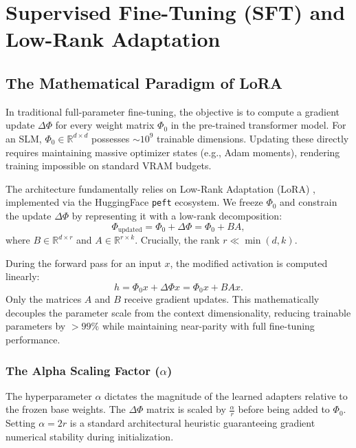 \documentclass[12pt,a4paper]{report}
\newcommand{\R}{\mathbb{R}}
\begin{document}
\chapter{Supervised Fine-Tuning (SFT) and Low-Rank Adaptation}
\label{chap:sft}

\section{The Mathematical Paradigm of LoRA}

In traditional full-parameter fine-tuning, the objective is to compute a gradient update $\Delta\Phi$ for every weight matrix $\Phi_0$ in the pre-trained transformer model. For an SLM, $\Phi_0 \in \R^{d \times d}$ possesses $\sim 10^9$ trainable dimensions. Updating these directly requires maintaining massive optimizer states (e.g., Adam moments), rendering training impossible on standard VRAM budgets.

The architecture fundamentally relies on Low-Rank Adaptation (LoRA) \cite{hu2021lora}, implemented via the HuggingFace \texttt{peft} ecosystem. We freeze $\Phi_0$ and constrain the update $\Delta\Phi$ by representing it with a low-rank decomposition:
\begin{equation}
    \Phi_{\text{updated}} = \Phi_0 + \Delta\Phi = \Phi_0 + B A,
\end{equation}
where $B \in \R^{d \times r}$ and $A \in \R^{r \times k}$. Crucially, the rank $r \ll \min(d, k)$. 

During the forward pass for an input $x$, the modified activation is computed linearly:
\begin{equation}
    h = \Phi_0 x + \Delta\Phi x = \Phi_0 x + B A x.
\end{equation}
Only the matrices $A$ and $B$ receive gradient updates. This mathematically decouples the parameter scale from the context dimensionality, reducing trainable parameters by $>99\%$ while maintaining near-parity with full fine-tuning performance.

\subsection{The Alpha Scaling Factor ($\alpha$)}
The hyperparameter $\alpha$ dictates the magnitude of the learned adapters relative to the frozen base weights. The $\Delta\Phi$ matrix is scaled by $\frac{\alpha}{r}$ before being added to $\Phi_0$. Setting $\alpha = 2r$ is a standard architectural heuristic guaranteeing gradient numerical stability during initialization.
\end{document}
